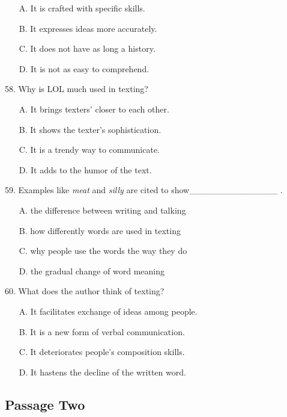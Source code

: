 \documentclass[UTF8,11pt]{ctexart}
\begin{document}
\begin{itemize}[leftmargin=2em,itemsep=.2em,topsep=.4em]\item[A.] It is crafted with specific skills.
\item[B.] It expresses ideas more accurately.
\item[C.] It does not have as long a history.
\item[D.] It is not as easy to comprehend.
\end{itemize}

58. Why is LOL much used in texting?


\begin{itemize}[leftmargin=2em,itemsep=.2em,topsep=.4em]\item[A.] It brings texters' closer to each other.
\item[B.] It shows the texter’s sophistication.
\item[C.] It is a trendy way to communicate.
\item[D.] It adds to the humor of the text.
\end{itemize}

59. Examples like\textit{ meat} and\textit{ silly} are cited to show\_\_\_\_\_\_\_\_\_\_\_\_\_\_ .


\begin{itemize}[leftmargin=2em,itemsep=.2em,topsep=.4em]\item[A.] the difference between writing and talking
\item[B.] how differently words are used in texting
\item[C.] why people use the words the way they do
\item[D.] the gradual change of word meaning
\end{itemize}

60. What does the author think of texting?


\begin{itemize}[leftmargin=2em,itemsep=.2em,topsep=.4em]\item[A.] It facilitates exchange of ideas among people.
\item[B.] It is a new form of verbal communication.
\item[C.] It deteriorates people’s composition skills.
\item[D.] It hastens the decline of the written word.
\end{itemize}

\subsection*{Passage Two}
\end{document}
